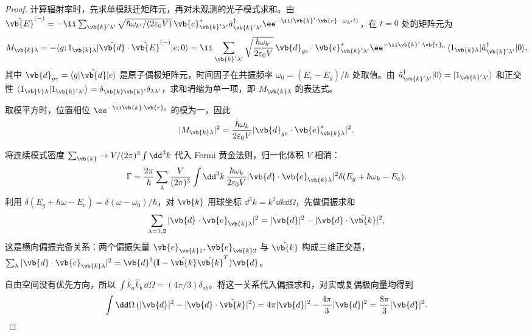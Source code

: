 \begin{proof}
计算辐射率时，先求单模跃迁矩阵元，再对未观测的光子模式求和。由 $\hat{\vb{E}}^{(-)}=-\ii\sum_{\vb{k}'\lambda'}\sqrt{\hbar\omega_{k'}/(2\varepsilon_0 V)}\,\vb{e}_{\vb{k}'\lambda'}^*\hat a_{\vb{k}'\lambda'}^\dagger\ee^{-\ii(\vb{k}'\cdot\vb{r}-\omega_{k'}t)}$，在 $t=0$ 处的矩阵元为
\begin{equation*}
M_{\vb{k}\lambda}
=-\langle g;1_{\vb{k}\lambda}|\hat{\vb{d}}\cdot\hat{\vb{E}}^{(-)}|e;0\rangle
=\ii\sum_{\vb{k}'\lambda'}\sqrt{\frac{\hbar\omega_{k'}}{2\varepsilon_0 V}}\,\vb{d}_{ge}\cdot\vb{e}_{\vb{k}'\lambda'}^*\ee^{-\ii\vb{k}'\cdot\vb{r}_0}\,\langle 1_{\vb{k}\lambda}|\hat a_{\vb{k}'\lambda'}^\dagger|0\rangle,
\end{equation*}
其中 $\vb{d}_{ge}=\langle g|\hat{\vb{d}}|e\rangle$ 是原子偶极矩阵元，时间因子在共振频率 $\omega_0=(E_e-E_g)/\hbar$ 处取值。由 $\hat a_{\vb{k}'\lambda'}^\dagger|0\rangle=|1_{\vb{k}'\lambda'}\rangle$ 和正交性 $\langle 1_{\vb{k}\lambda}|1_{\vb{k}'\lambda'}\rangle=\delta_{\vb{k}\vb{k}'}\delta_{\lambda\lambda'}$，求和坍缩为单一项，即 $M_{\vb{k}\lambda}$ 的表达式。

取模平方时，位置相位 $\ee^{-\ii\vb{k}\cdot\vb{r}_0}$ 的模为一，因此
\begin{equation*}
|M_{\vb{k}\lambda}|^2
=\frac{\hbar\omega_k}{2\varepsilon_0 V}
|\vb{d}_{ge}\cdot\vb{e}_{\vb{k}\lambda}^*|^2.
\end{equation*}

将连续模式密度 $\sum_{\vb{k}}\to V/(2\pi)^3\int\dd^3k$ 代入 Fermi 黄金法则，归一化体积 $V$ 相消：
\begin{equation*}
\Gamma=\frac{2\pi}{\hbar}\sum_\lambda\frac{V}{(2\pi)^3}\int\dd^3 k\,\frac{\hbar\omega_k}{2\varepsilon_0 V}|\vb{d}\cdot\vb{e}_{\vb{k}\lambda}|^2\delta(E_g+\hbar\omega_k-E_e).
\end{equation*}
利用 $\delta(E_g+\hbar\omega-E_e)=\delta(\omega-\omega_0)/\hbar$，对 $\vb{k}$ 用球坐标 $\dd^3 k=k^2\dd k\dd\Omega$，先做偏振求和
\begin{equation*}
\sum_{\lambda=1,2}|\vb{d}\cdot\vb{e}_{\vb{k}\lambda}|^2
=|\vb{d}|^2-|\vb{d}\cdot\hat{\vb{k}}|^2,
\end{equation*}
这是横向偏振完备关系：两个偏振矢量 $\vb{e}_{\vb{k}1},\vb{e}_{\vb{k}2}$ 与 $\hat{\vb{k}}$ 构成三维正交基，$\sum_\lambda|\vb{d}\cdot\vb{e}_{\vb{k}\lambda}|^2=\vb{d}^\dagger(\mathbf I-\hat{\vb{k}}\hat{\vb{k}}^T)\vb{d}$。

自由空间没有优先方向，所以 $\int\hat k_a\hat k_b\,\dd\Omega=(4\pi/3)\delta_{ab}$。将这一关系代入偏振求和，对实或复偶极向量均得到
\begin{equation*}
\int\dd\Omega\,(|\vb{d}|^2-|\vb{d}\cdot\hat{\vb{k}}|^2)
=4\pi|\vb{d}|^2-\frac{4\pi}{3}|\vb{d}|^2
=\frac{8\pi}{3}|\vb{d}|^2.
\end{equation*}


\end{proof}
